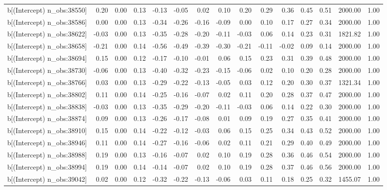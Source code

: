 \begin{table}[ht]
\begin{tabular}{rrrrrrrrrrrrrrr}
  b[(Intercept) n\_obs:38550] & 0.20 & 0.00 & 0.13 & -0.13 & -0.05 & 0.02 & 0.10 & 0.20 & 0.29 & 0.36 & 0.45 & 0.51 & 2000.00 & 1.00 \\ 
  b[(Intercept) n\_obs:38586] & 0.00 & 0.00 & 0.13 & -0.34 & -0.26 & -0.16 & -0.09 & 0.00 & 0.10 & 0.17 & 0.27 & 0.34 & 2000.00 & 1.00 \\ 
  b[(Intercept) n\_obs:38622] & -0.03 & 0.00 & 0.13 & -0.35 & -0.28 & -0.20 & -0.11 & -0.03 & 0.06 & 0.14 & 0.23 & 0.31 & 1821.82 & 1.00 \\ 
  b[(Intercept) n\_obs:38658] & -0.21 & 0.00 & 0.14 & -0.56 & -0.49 & -0.39 & -0.30 & -0.21 & -0.11 & -0.02 & 0.09 & 0.14 & 2000.00 & 1.00 \\ 
  b[(Intercept) n\_obs:38694] & 0.15 & 0.00 & 0.12 & -0.17 & -0.10 & -0.01 & 0.06 & 0.15 & 0.23 & 0.31 & 0.39 & 0.48 & 2000.00 & 1.00 \\ 
  b[(Intercept) n\_obs:38730] & -0.06 & 0.00 & 0.13 & -0.40 & -0.32 & -0.23 & -0.15 & -0.06 & 0.02 & 0.10 & 0.20 & 0.28 & 2000.00 & 1.00 \\ 
  b[(Intercept) n\_obs:38766] & 0.03 & 0.00 & 0.13 & -0.29 & -0.22 & -0.13 & -0.05 & 0.03 & 0.12 & 0.20 & 0.30 & 0.37 & 1321.34 & 1.00 \\ 
  b[(Intercept) n\_obs:38802] & 0.11 & 0.00 & 0.14 & -0.25 & -0.16 & -0.07 & 0.02 & 0.11 & 0.20 & 0.28 & 0.37 & 0.47 & 2000.00 & 1.00 \\ 
  b[(Intercept) n\_obs:38838] & -0.03 & 0.00 & 0.13 & -0.35 & -0.29 & -0.20 & -0.11 & -0.03 & 0.06 & 0.14 & 0.22 & 0.30 & 2000.00 & 1.00 \\ 
  b[(Intercept) n\_obs:38874] & 0.09 & 0.00 & 0.13 & -0.26 & -0.17 & -0.08 & 0.01 & 0.09 & 0.19 & 0.27 & 0.35 & 0.41 & 2000.00 & 1.00 \\ 
  b[(Intercept) n\_obs:38910] & 0.15 & 0.00 & 0.14 & -0.22 & -0.12 & -0.03 & 0.06 & 0.15 & 0.25 & 0.34 & 0.43 & 0.52 & 2000.00 & 1.00 \\ 
  b[(Intercept) n\_obs:38946] & 0.11 & 0.00 & 0.14 & -0.27 & -0.16 & -0.06 & 0.02 & 0.11 & 0.21 & 0.29 & 0.40 & 0.49 & 2000.00 & 1.00 \\ 
  b[(Intercept) n\_obs:38988] & 0.19 & 0.00 & 0.13 & -0.16 & -0.07 & 0.02 & 0.10 & 0.19 & 0.28 & 0.36 & 0.46 & 0.54 & 2000.00 & 1.00 \\ 
  b[(Intercept) n\_obs:38994] & 0.19 & 0.00 & 0.14 & -0.14 & -0.07 & 0.02 & 0.10 & 0.19 & 0.28 & 0.37 & 0.46 & 0.56 & 2000.00 & 1.00 \\ 
  b[(Intercept) n\_obs:39042] & 0.02 & 0.00 & 0.12 & -0.32 & -0.22 & -0.13 & -0.06 & 0.03 & 0.11 & 0.18 & 0.25 & 0.32 & 1455.07 & 1.00 \\ 

\end{tabular}
\end{table}

